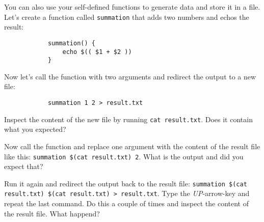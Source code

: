 \begin{challenge}
    \begin{task}
        You can also use your self-defined functions to generate data and store it in a file.
        Let's create a function called \texttt{summation} that adds two numbers and echos the result:
        \begin{lstlisting}
            summation() {
                echo $(( $1 + $2 ))
            }
        \end{lstlisting}
        Now let's call the function with two arguments and redirect the output to a new file:
        \begin{lstlisting}
            summation 1 2 > result.txt
        \end{lstlisting}
        \begin{questions}
            \item Inspect the content of the new file by running \texttt{cat result.txt}. Does it contain what you expected?
            \item Now call the function and replace one argument with the content of the result file like this: \texttt{summation \$(cat result.txt) 2}. What is the output and did you expect that?
            \item Run it again and redirect the output back to the result file: \texttt{summation \$(cat result.txt) \$(cat result.txt) > result.txt}. Type the \textit{UP}-arrow-key and repeat the last command. Do this a couple of times and inspect the content of the result file. What happend?
        \end{questions}
    \end{task}


\end{challenge}
